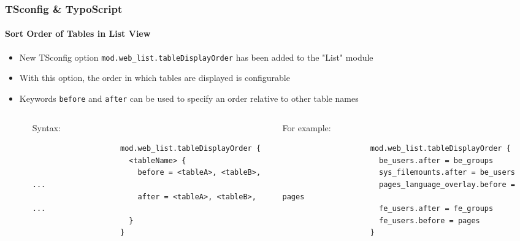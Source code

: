\begin{frame}[fragile]
	\frametitle{TSconfig \& TypoScript}
	\framesubtitle{Sort Order of Tables in List View}

	\lstset{basicstyle=\tiny\ttfamily}

	\begin{itemize}

		\item New TSconfig option \texttt{mod.web\_list.tableDisplayOrder} has been added to the "List" module

		\item With this option, the order in which tables are displayed is configurable

		\item Keywords \texttt{before} and \texttt{after} can be used to specify an order relative to other table names

		\begin{columns}[T]
			\begin{column}{.07\textwidth}
			\end{column}
			\begin{column}{.465\textwidth}

				\small Syntax:\normalsize

				\begin{lstlisting}
					mod.web_list.tableDisplayOrder {
					  <tableName> {
					    before = <tableA>, <tableB>, ...
					    after = <tableA>, <tableB>, ...
					  }
					}
				\end{lstlisting}
			\end{column}
			\begin{column}{.465\textwidth}

				\small For example:\normalsize

				\begin{lstlisting}
					mod.web_list.tableDisplayOrder {
					  be_users.after = be_groups
					  sys_filemounts.after = be_users
					  pages_language_overlay.before = pages
					  fe_users.after = fe_groups
					  fe_users.before = pages
					}
				\end{lstlisting}

			\end{column}
		\end{columns}

	\end{itemize}

\end{frame}


